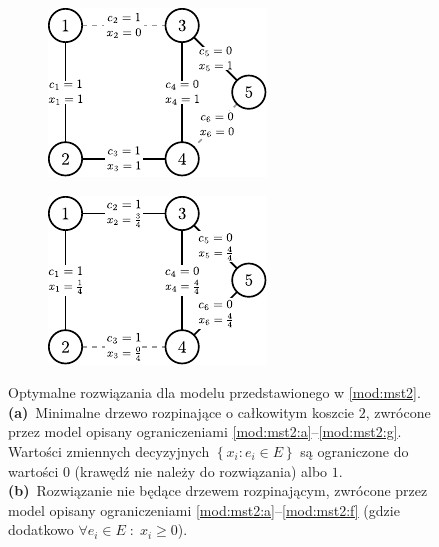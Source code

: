 \begin{figure}[!htbp]
	\null\hfill
	\begin{subfigure}[b]{0.4\textwidth}
		\includegraphics[width=\textwidth]{Chapter_III/MST3-example/a}
		\caption{}
		\label{fig:mst3Example:a}
	\end{subfigure}
	\hfill
	\begin{subfigure}[b]{0.4\textwidth}
		\includegraphics[width=\textwidth]{Chapter_III/MST3-example/b}
		\caption{}
		\label{fig:mst3Example:b}
	\end{subfigure}
	\hfill\null
	\caption{
		Optymalne rozwiązania dla modelu przedstawionego w \ref{mod:mst2}.
		\textbf{(a)}~Minimalne drzewo rozpinające o całkowitym koszcie $2$, zwrócone przez model opisany ograniczeniami \ref{mod:mst2:a}--\ref{mod:mst2:g}. Wartości zmiennych decyzyjnych $\left\{ x_{i} : e_{i} \in E \right\}$ są ograniczone do wartości $0$ (krawędź nie należy do rozwiązania) albo $1$.
		\textbf{(b)}~Rozwiązanie nie będące drzewem rozpinającym, zwrócone przez model opisany ograniczeniami \ref{mod:mst2:a}--\ref{mod:mst2:f} (gdzie dodatkowo $\forall e_{i} \in E \; : \; x_{i} \geqslant 0$).
	}
	\label{fig:mst3Example}
\end{figure}

